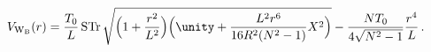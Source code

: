 \begin{equation}
V_{\rm W_B}(r)=\frac{T_0}{L}\,{\rm STr}\, \sqrt{\Bigl(1+\frac{r^2}{L^2}\Bigr)
\Bigl(\unity+\frac{L^2r^6}{16R^2(N^2-1)}X^2\Bigr)}-\frac{NT_0}{4\sqrt{N^2-1}}
\frac{r^4}{L}\, .
\end{equation}

